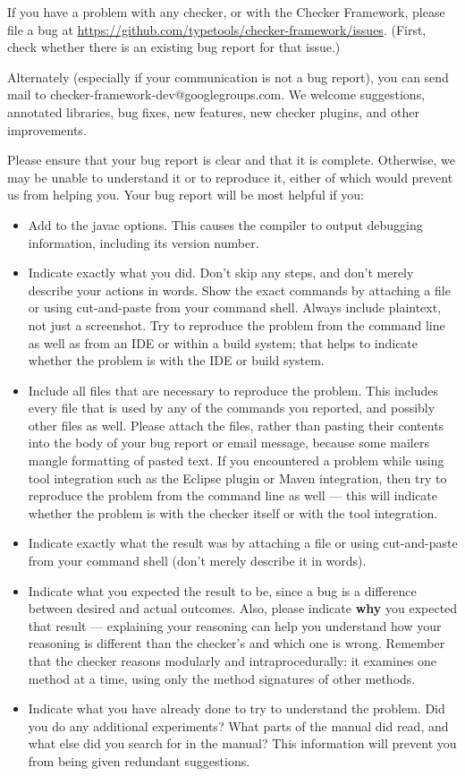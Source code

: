 If you have a problem with any checker, or with the Checker Framework,
please file a bug at
\url{https://github.com/typetools/checker-framework/issues}.
(First, check whether there is an existing bug report for that issue.)

Alternately (especially if your communication is not a bug report), you can
send mail to checker-framework-dev@googlegroups.com.
We welcome suggestions, annotated libraries, bug fixes, new
features, new checker plugins, and other improvements.

Please ensure that your bug report is clear and that it is complete.
Otherwise, we may be unable to understand it or to reproduce it, either of
which would prevent us from helping you.  Your bug report will be most
helpful if you:

\begin{itemize}
\item
  Add 
  to the javac options.  This causes the compiler to output
  debugging information, including its version number.
\item
  Indicate exactly what you did.  Don't skip any steps, and don't merely
  describe your actions in words.  Show the exact commands by attaching a
  file or using cut-and-paste from your command shell.  Always include
  plaintext, not just a screenshot.  Try to reproduce the problem from the
  command line as well as from an IDE or within a build system; that helps
  to indicate whether the problem is with the IDE or build system.
\item
  Include all files that are necessary to reproduce the problem.  This
  includes every file that is used by any of the commands you reported, and
  possibly other files as well.  Please attach the files, rather than
  pasting their contents into the body of your bug report or email message,
  because some mailers mangle formatting of pasted text.  If you
  encountered a problem while using tool integration such as the Eclipse
  plugin or Maven integration, then try to reproduce the problem from the
  command line as well --- this will indicate whether the problem is with
  the checker itself or with the tool integration.
\item
  Indicate exactly what the result was by attaching a file or using
  cut-and-paste from your command shell (don't merely describe it in
  words).
\item
  Indicate what you expected the result to be, since a bug is a difference
  between desired and actual outcomes.  Also, please indicate \textbf{why}
  you expected that result --- explaining your reasoning can help you
  understand how your reasoning is different than the checker's and which
  one is wrong.  Remember that the checker reasons modularly and
  intraprocedurally:  it examines one method at a time, using only the
  method signatures of other methods.
\item
  Indicate what you have already done to try to understand the problem.
  Did you do any additional experiments?  What parts of the manual did
  read, and what else did you search for in the manual?  This information
  will prevent you from being given redundant suggestions.
\end{itemize}

